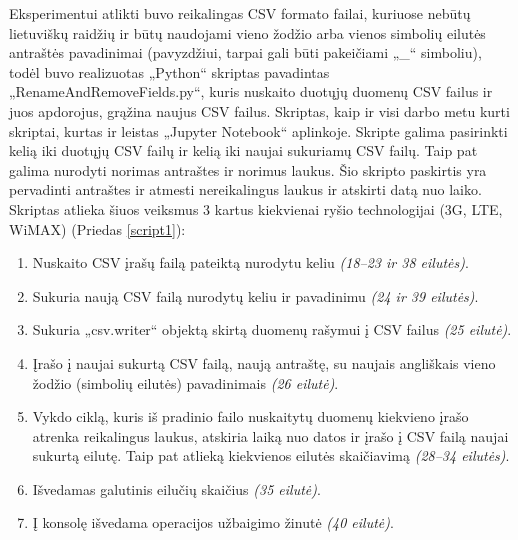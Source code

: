 \documentclass{VUMIFPSbakalaurinis}
\begin{document}
Eksperimentui atlikti buvo reikalingas CSV formato failai, kuriuose nebūtų lietuviškų raidžių ir būtų naudojami vieno žodžio arba vienos simbolių eilutės antraštės pavadinimai (pavyzdžiui, tarpai gali būti pakeičiami „\_“ simboliu), todėl buvo realizuotas „Python“ skriptas pavadintas „RenameAndRemoveFields.py“, kuris nuskaito duotųjų duomenų CSV failus ir juos apdorojus, grąžina naujus CSV failus. Skriptas, kaip ir visi darbo metu kurti skriptai, kurtas ir leistas „Jupyter Notebook“ aplinkoje. Skripte galima pasirinkti kelią iki duotųjų CSV failų ir kelią iki naujai sukuriamų CSV failų. Taip pat galima nurodyti norimas antraštes ir norimus laukus. Šio skripto paskirtis yra pervadinti antraštes ir atmesti nereikalingus laukus ir atskirti datą nuo laiko. Skriptas atlieka šiuos veiksmus 3 kartus kiekvienai ryšio technologijai (3G, LTE, WiMAX) (Priedas \ref{script1}):
\begin{enumerate}
	\item Nuskaito CSV įrašų failą pateiktą nurodytu keliu \textit{(18–23 ir 38 eilutės)}.
	\item Sukuria naują CSV failą nurodytų keliu ir pavadinimu \textit{(24 ir 39 eilutės)}.
	\item Sukuria „csv.writer“ objektą skirtą duomenų rašymui į CSV failus\textit{ (25 eilutė)}.
	\item Įrašo į naujai sukurtą CSV failą, naują antraštę, su naujais angliškais vieno žodžio (simbolių eilutės) pavadinimais \textit{(26 eilutė)}.
	\item Vykdo ciklą, kuris iš pradinio failo nuskaitytų duomenų kiekvieno įrašo atrenka reikalingus laukus, atskiria laiką nuo datos ir įrašo į CSV failą naujai sukurtą eilutę. Taip pat atlieką kiekvienos eilutės skaičiavimą \textit{(28–34 eilutės)}.
	\item Išvedamas galutinis eilučių skaičius \textit{(35 eilutė)}.
	\item Į konsolę išvedama operacijos užbaigimo žinutė \textit{(40 eilutė)}.
\end{enumerate}
\end{document}

